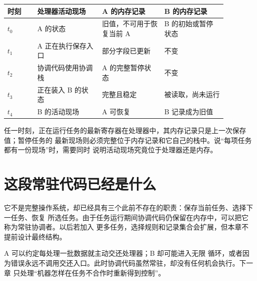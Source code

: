\begin{longtable}{|L{0.12\linewidth}|L{0.26\linewidth}|L{0.25\linewidth}|L{0.25\linewidth}|}
\hline
{}
时刻 & 处理器活动现场 & A 的内存记录 & B 的内存记录 \\ \hline
\(t_0\) & A 的状态 & 旧值，不可用于恢复当前 A & B 的初始或暂停状态 \\ \hline
\(t_1\) & A 正在执行保存入口 & 部分字段已更新 & 不变 \\ \hline
\(t_2\) & 协调代码使用协调栈 & A 的完整暂停状态 & 不变 \\ \hline
\(t_3\) & 正在装入 B 的状态 & 完整且稳定 & 被读取，尚未运行 \\ \hline
\(t_4\) & B 的活动现场 & A 可恢复 & B 记录成为旧值 \\ \hline
\end{longtable}

任一时刻，正在运行任务的最新寄存器在处理器中，其内存记录只是上一次保存值；暂停任务的
最新现场则必须完整位于内存记录和它自己的栈中。说“每项任务都有一份现场”时，需要同时
说明活动现场究竟位于处理器还是内存。

\section{这段常驻代码已经是什么}

它不是完整操作系统，却已经具有三个此前不存在的职责：保存当前任务、选择下一任务、恢复
所选任务。由于任务运行期间协调代码仍保留在内存中，可以把它称为常驻协调者。以后若加入
更多任务，选择规则和记录集合会扩展，但本章不提前设计最终结构。

A 可以约定每处理一批数据就主动交还处理器；B 却可能进入无限
循环，或者因为错误永远不调用交还入口。此时协调代码虽然常驻，却没有任何机会执行。下一章
只处理“机器怎样在任务不合作时重新得到控制”。
